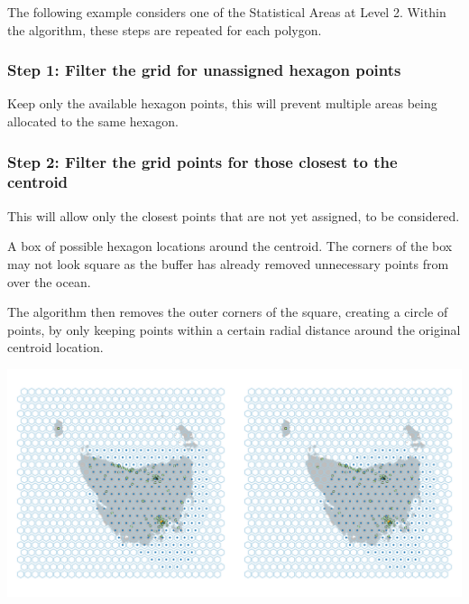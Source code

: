 \documentclass[
]{jss}
\begin{document}
The following example considers one of the Statistical Areas at Level 2.
Within the algorithm, these steps are repeated for each polygon.

\hypertarget{step-1-filter-the-grid-for-unassigned-hexagon-points}{%
\subsubsection{Step 1: Filter the grid for unassigned hexagon
points}\label{step-1-filter-the-grid-for-unassigned-hexagon-points}}

Keep only the available hexagon points, this will prevent multiple areas
being allocated to the same hexagon.

\hypertarget{step-2-filter-the-grid-points-for-those-closest-to-the-centroid}{%
\subsubsection{Step 2: Filter the grid points for those closest to the
centroid}\label{step-2-filter-the-grid-points-for-those-closest-to-the-centroid}}

This will allow only the closest points that are not yet assigned, to be
considered.

A box of possible hexagon locations around the centroid. The corners of
the box may not look square as the buffer has already removed
unnecessary points from over the ocean.

The algorithm then removes the outer corners of the square, creating a
circle of points, by only keeping points within a certain radial
distance around the original centroid location.

\begin{CodeChunk}


\begin{center}\includegraphics[width=1\linewidth]{figures/4grid} \end{center}

\end{CodeChunk}
\end{document}
